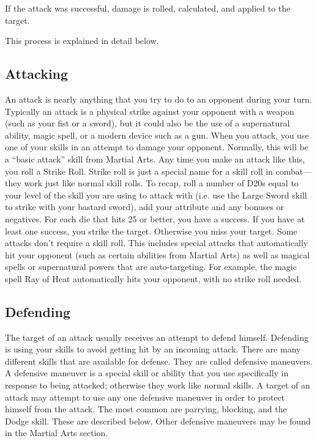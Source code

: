 \documentclass[twoside]{book}
\begin{document}
                
                
                   If the attack was successful, damage is rolled,
                   calculated, and applied to the target. 
                
             This process is explained in detail below. 
\subsection{Attacking}
     An attack is nearly anything that you try to do to
               an opponent during your turn. Typically an attack is a
               physical strike against your opponent with a weapon (such
               as your fist or a sword), but it could also be the use of
               a supernatural ability, magic spell, or a modern device
               such as a gun.  When you attack, you use one of your skills in an
              attempt to damage your opponent. Normally, this will be a
              “basic attack” skill from Martial Arts. Any
              time you make an attack like this, you roll a Strike Roll.
              Strike roll is just a special name for a skill roll in
              combat—they work just like normal skill rolls. To
              recap, roll a number of D20s equal to your level of the
              skill you are using to attack with (i.e. use the Large
              Sword skill to strike with your bastard sword), add your
              attribute and any bonuses or negatives. For each die that
              hits 25 or better, you have a success.
                If you have at least one success, you strike the
                target.   Otherwise you miss your target.
             Some attacks don’t require a skill roll. This
               includes special attacks that automatically hit your
               opponent (such as certain abilities from Martial Arts) as
               well as magical spells or supernatural powers that are
               auto-targeting. For example, the magic spell Ray of Heat
               automatically hits your opponent, with no strike roll
               needed. 
\subsection{Defending}
     The target of an attack usually receives an attempt
              to defend himself.
                Defending is using your skills to avoid getting hit
                by an incoming attack.   There are many different
                skills that are available for defense. They are called
                defensive maneuvers. A defensive maneuver is a special
                skill or ability that you use specifically in response to
                being attacked; otherwise they work like normal skills. A
                target of an attack may attempt to use any one defensive
                maneuver in order to protect himself from the attack. The
                most common are parrying, blocking, and the Dodge skill.
                These are described below. Other defensive maneuvers may
                be found in the Martial Arts section.
              
\end{document}
